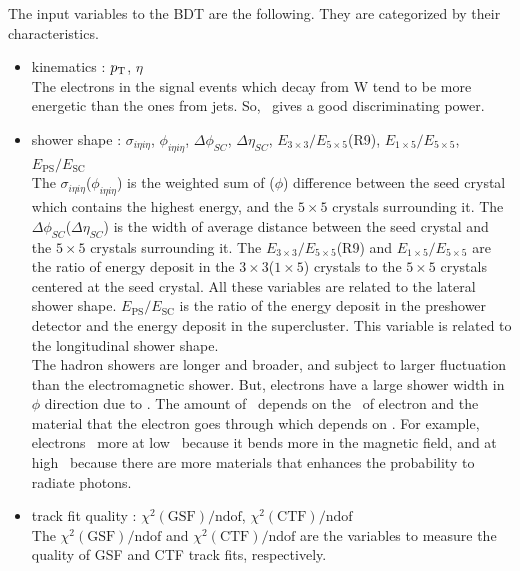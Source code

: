 The input variables to the BDT are the following. They are categorized by 
their characteristics.  
\begin{itemize}
\item kinematics : $p_\mathrm{T}$,  $\eta$ \\  

The electrons in the signal events which decay from W tend to be 
more energetic than the ones from jets. So, \pt\ gives a good 
discriminating power. 

\item shower shape : $\sigma_{i\eta i\eta}$, $\phi_{i\eta i\eta}$, $\Delta \phi_{SC}$, 
                     $\Delta \eta_{SC}$, $E_{3\times3}/E_{5\times5}$(R9), 
                     $E_{1\times5}/E_{5\times5}$, $E_{\textrm{PS}}/E_{\textrm{SC}}$ \\ 

The $\sigma_{i\eta i\eta}$($\phi_{i\eta i\eta}$) is the weighted sum of \Eta($\phi$) 
difference between the seed crystal which contains the highest energy, 
and the $5\times5$ crystals surrounding it.
The $\Delta \phi_{SC}$($\Delta \eta_{SC}$) is the width of average distance 
between the seed crystal and the $5\times5$ crystals surrounding it.
The $E_{3\times3}/E_{5\times5}$(R9) and $E_{1\times5}/E_{5\times5}$ 
are the ratio of energy deposit in the $3\times3$($1\times5$) crystals to the
$5\times5$ crystals centered at the seed crystal. All these variables 
are related to the lateral shower shape. 
$E_{\textrm{PS}}/E_{\textrm{SC}}$ is the ratio of the energy deposit in the preshower 
detector and the energy deposit in the supercluster. This variable is 
related to the longitudinal shower shape. \\ 

The hadron showers are longer and broader, and subject to larger fluctuation 
than the electromagnetic shower. But, electrons have a large shower width       
in $\phi$ direction due to \brem. The amount of \brem\ depends on the \pt\ 
of electron and the material that the electron goes through which depends 
on \Eta. For example, electrons \brem\ more at low \pt\ because it bends 
more in the magnetic field, and at high \Eta\ because there are more 
materials that enhances the probability to radiate photons. 


\item track fit quality : $\chi^2(\textrm{GSF})/\textrm{ndof} $, 
                          $\chi^2(\textrm{CTF})/\textrm{ndof}$ \\

The $\chi^2(\textrm{GSF})/\textrm{ndof}$ and $\chi^2(\textrm{CTF})/\textrm{ndof}$
are the variables to measure the quality of GSF and CTF track fits, respectively. \\  


\end{itemize}
